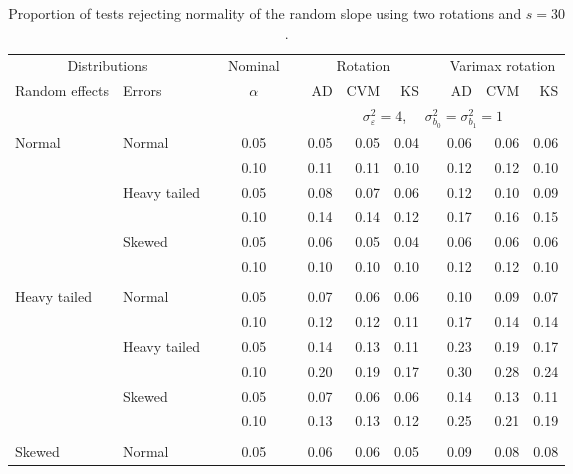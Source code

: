\begin{table}[ht]
\centering
\caption{\label{tab:simb130}Proportion of tests rejecting normality of the random slope using two rotations and $s = 30$.}
\begin{scriptsize}
\begin{tabular}{ll p{.1cm} c p{.1cm} rrr p{.1cm} rrr}
  \hline
  \multicolumn{2}{c}{Distributions}& & Nominal & &  \multicolumn{3}{c}{Rotation} & & \multicolumn{3}{c}{Varimax rotation} \\ \cline{1-2} \cline{6-8} \cline{10-12}   
  Random effects & Errors & & $\alpha$ & & AD & CVM & KS & & AD & CVM & KS \\ 
   \hline
& && && \multicolumn{7}{c}{$\sigma_{\varepsilon}^2 = 4$, \ \ $\sigma_{b_0}^2 = \sigma_{b_1}^2 = 1$} \\ \cline{6-12}
\rowcolor{gray!20}Normal       & Normal       && 0.05 &&  0.05 & 0.05 & 0.04 && 0.06 & 0.06 & 0.06 \\ 
\rowcolor{gray!20}             &              && 0.10 &&  0.11 & 0.11 & 0.10 && 0.12 & 0.12 & 0.10 \\ 
\rowcolor{gray!20}             & Heavy tailed && 0.05 &&  0.08 & 0.07 & 0.06 && 0.12 & 0.10 & 0.09 \\ 
\rowcolor{gray!20}             &              && 0.10 &&  0.14 & 0.14 & 0.12 && 0.17 & 0.16 & 0.15 \\ 
\rowcolor{gray!20}             & Skewed       && 0.05 &&  0.06 & 0.05 & 0.04 && 0.06 & 0.06 & 0.06 \\ 
\rowcolor{gray!20}             &              && 0.10 &&  0.10 & 0.10 & 0.10 && 0.12 & 0.12 & 0.10 \\ 
             &&&&&&&&&&&\\
Heavy tailed & Normal       && 0.05 &&  0.07 & 0.06 & 0.06 && 0.10 & 0.09 & 0.07 \\ 
             &              && 0.10 &&  0.12 & 0.12 & 0.11 && 0.17 & 0.14 & 0.14 \\ 
             & Heavy tailed && 0.05 &&  0.14 & 0.13 & 0.11 && 0.23 & 0.19 & 0.17 \\ 
             &              && 0.10 &&  0.20 & 0.19 & 0.17 && 0.30 & 0.28 & 0.24 \\ 
             & Skewed       && 0.05 &&  0.07 & 0.06 & 0.06 && 0.14 & 0.13 & 0.11 \\ 
             &              && 0.10 &&  0.13 & 0.13 & 0.12 && 0.25 & 0.21 & 0.19 \\ 
             &&&&&&&&&&&\\
Skewed       & Normal       && 0.05 &&  0.06 & 0.06 & 0.05 && 0.09 & 0.08 & 0.08 \\ 

\end{tabular}
\end{scriptsize}
\end{table}
